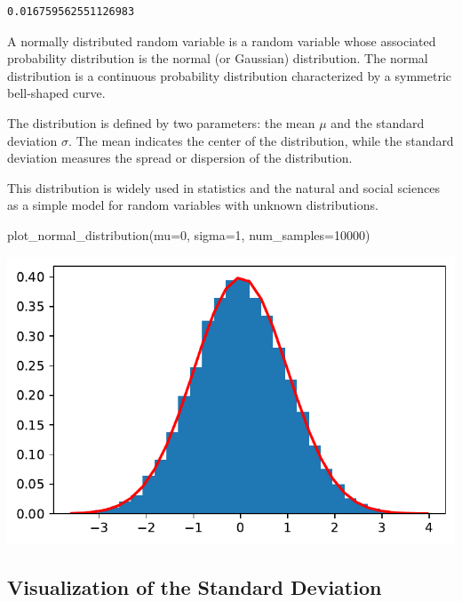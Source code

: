 \documentclass[
  letterpaper,
  DIV=11,
  numbers=noendperiod]{scrreprt}
\newenvironment{Shaded}{\begin{snugshade}}{\end{snugshade}}
\newcommand{\DecValTok}[1]{\textcolor[rgb]{0.68,0.00,0.00}{#1}}
\newcommand{\NormalTok}[1]{\textcolor[rgb]{0.00,0.23,0.31}{#1}}
\newcommand{\OperatorTok}[1]{\textcolor[rgb]{0.37,0.37,0.37}{#1}}
\begin{document}
\begin{verbatim}
0.016759562551126983
\end{verbatim}

A normally distributed random variable is a random variable whose
associated probability distribution is the normal (or Gaussian)
distribution. The normal distribution is a continuous probability
distribution characterized by a symmetric bell-shaped curve.

The distribution is defined by two parameters: the mean \(\mu\) and the
standard deviation \(\sigma\). The mean indicates the center of the
distribution, while the standard deviation measures the spread or
dispersion of the distribution.

This distribution is widely used in statistics and the natural and
social sciences as a simple model for random variables with unknown
distributions.

\begin{Shaded}
\begin{Highlighting}[]
\NormalTok{plot\_normal\_distribution(mu}\OperatorTok{=}\DecValTok{0}\NormalTok{, sigma}\OperatorTok{=}\DecValTok{1}\NormalTok{, num\_samples}\OperatorTok{=}\DecValTok{10000}\NormalTok{)}
\end{Highlighting}
\end{Shaded}

\includegraphics{006_num_gp_files/figure-pdf/cell-20-output-1.pdf}

\subsection{Visualization of the Standard
Deviation}\label{visualization-of-the-standard-deviation}
\end{document}
